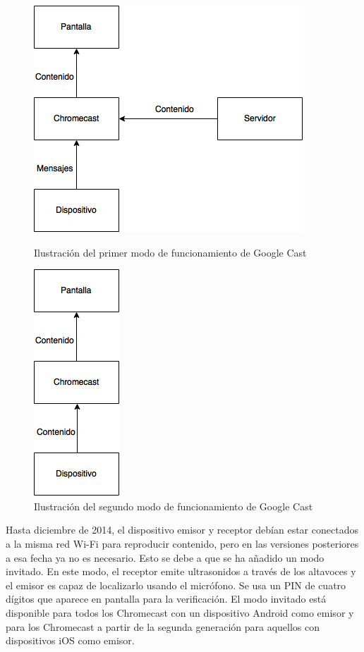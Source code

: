 \begin{figure}[h]
	\centering
	\begin{minipage}[b]{.35\textwidth}
		\centering
		\includegraphics[scale=0.65]{./Imagenes/ChromecastModo1.png}
		\caption{Ilustración del primer modo de funcionamiento de Google Cast}\label{fig:modo1}
	\end{minipage}\qquad
	\hspace{1cm}
	\begin{minipage}[b]{.35\textwidth}
		\centering
		\includegraphics[scale=0.65]{./Imagenes/ChromecastModo2.png}
		\caption{Ilustración del segundo modo de funcionamiento de Google Cast}\label{fig:modo2}
	\end{minipage}
\end{figure}

Hasta diciembre de 2014, el dispositivo emisor y receptor debían estar conectados a la misma red Wi-Fi para reproducir contenido, pero en las versiones posteriores a esa fecha ya no es necesario.
Esto se debe a que se ha añadido un modo invitado.
En este modo, el receptor emite ultrasonidos a través de los altavoces y el emisor es capaz de localizarlo usando el micrófono.
Se usa un PIN de cuatro dígitos que aparece en pantalla para la verificación.
El modo invitado está disponible para todos los Chromecast con un dispositivo Android como emisor y para los Chromecast a partir de la segunda generación para aquellos con dispositivos iOS como emisor.

